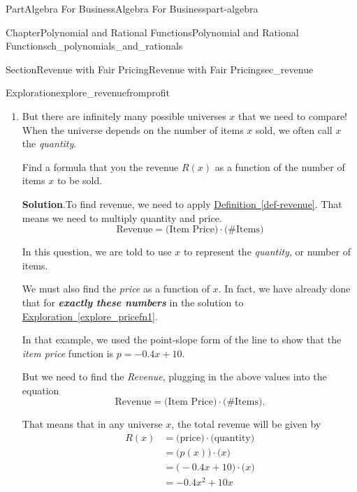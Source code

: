 \documentclass{tufte-book}
\newcommand{\blocktitlefont}{\relax}
\newcommand{\xreffont}{\relax}
\newcommand{\alert}[1]{\textbf{\textit{#1}}}
\numberwithin{equation}{chapter}
\begin{document}
\begin{partptx}{Part}{Algebra For Business}{}{Algebra For Business}{}{}{part-algebra}
\begin{chapterptx}{Chapter}{Polynomial and Rational Functions}{}{Polynomial and Rational Functions}{}{}{ch_polynomials_and_rationals}
\begin{sectionptx}{Section}{Revenue with Fair Pricing}{}{Revenue with Fair Pricing}{}{}{sec_revenue}
\begin{exploration}{Exploration}{}{explore_revenuefromprofit}
\begin{enumerate}[font=\bfseries,label=(\alph*),ref=\alph*]
\par
In the scenario where we sell 20 items at 2\textdollar{}\slash{}item, our total revenue will be \(R(20) = 20\cdot 2 = 40\$\).%
\item{}But there are infinitely many possible universes \(x\) that we need to compare! When the universe depends on the number of items \(x\) sold, we often call \(x\) the \emph{quantity}.%
\par
Find a formula that you the revenue \(R(x)\) as a function of the number of items \(x\) to be sold.%
\par\smallskip%
\noindent\textbf{\blocktitlefont Solution}.\hypertarget{explore_revenuefromprofit-4-2}{}\quad{}To find revenue, we need to apply \hyperref[def-revenue]{Definition~{\xreffont\ref{def-revenue}}}.  That means we need to multiply quantity and price.%
\begin{equation*}
\text{Revenue} = \Big(\text{Item Price}\Big) \cdot \Big(\text{\# Items}\Big)
\end{equation*}
%
\par
In this question, we are told to use \(x\) to represent the \emph{quantity}, or number of items.%
\par
We must also find the \emph{price} as a function of \(x\). In fact, we have already done that for \alert{exactly these numbers} in the solution to \hyperref[explore_pricefn1]{Exploration~{\xreffont\ref{explore_pricefn1}}}.%
\par
In that example, we used the point-slope form of the line to show that the \emph{item price} function is  \(p = -0.4 x + 10\).%
\par
But we need to find the \emph{Revenue}, plugging in the above values into the equation%
\begin{equation*}
\text{Revenue} = \Big(\text{Item Price}\Big) \cdot \Big(\text{\# Items}\Big)\text{.}
\end{equation*}
%
\par
That means that in any universe \(x\), the total revenue will be given by%
\begin{equation*}
\begin{aligned}
R(x)  &=  \Big(\text{price}\Big) \cdot \Big(\text{quantity}\Big) \\
&=  \Big(p(x) \Big) \cdot \Big(x\Big) \\
&=  \Big(-0.4 x + 10\Big)\cdot \Big(x\Big) \\ 
&=  -0.4x^2 + 10x\end{aligned}
\end{equation*}

\end{enumerate}
\end{exploration}
\end{sectionptx}
\end{chapterptx}
\end{partptx}
\end{document}
